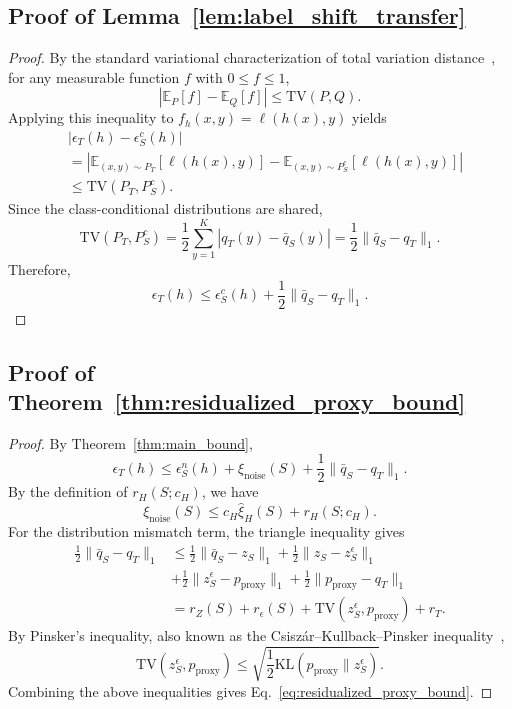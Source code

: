 \documentclass[conference]{IEEEtran}
\theoremstyle{definition}
\theoremstyle{remark}
\begin{document}
\subsection{Proof of Lemma~\ref{lem:label_shift_transfer}}
\begin{proof}
By the standard variational characterization of total variation distance~\cite{gibbs2002choosing}, for any measurable function $f$ with $0\le f\le 1$,
\[
\left|
\mathbb E_P[f]-\mathbb E_Q[f]
\right|
\le
\mathrm{TV}(P,Q).
\]
Applying this inequality to $f_h(x,y)=\ell(h(x),y)$ yields
\begin{align}
&\big|\epsilon_T(h)-\epsilon_S^c(h)\big| \\
&=
\left|
\mathbb{E}_{(x,y)\sim P_T}
\left[
\ell(h(x),y)
\right]
-
\mathbb{E}_{(x,y)\sim P_S^c}
\left[
\ell(h(x),y)
\right]
\right| \\
&\le
\mathrm{TV}(P_T,P_S^c).
\end{align}
Since the class-conditional distributions are shared,
\begin{equation}
\label{eq:TV_equality}
\mathrm{TV}(P_T,P_S^c)
=
\frac{1}{2}
\sum_{y=1}^{K}
\left|
q_T(y)-\bar q_S(y)
\right|
=
\frac{1}{2}
\|\bar q_S-q_T\|_1.
\end{equation}
Therefore,
\[
\epsilon_T(h)
\le
\epsilon_S^c(h)
+
\frac{1}{2}\|\bar q_S-q_T\|_1.
\]
\end{proof}
\subsection{Proof of Theorem~\ref{thm:residualized_proxy_bound}}
\begin{proof}
By Theorem~\ref{thm:main_bound},
\begin{equation}
\epsilon_T(h)
\le
\epsilon_S^n(h)
+
\xi_{\mathrm{noise}}(S)
+
\frac12\|\bar q_S-q_T\|_1.
\end{equation}
By the definition of $r_H(S;c_H)$, we have
\begin{equation}
\xi_{\mathrm{noise}}(S)
\le
c_H\widehat{\xi}_{H}(S)
+
r_H(S;c_H).
\end{equation}
For the distribution mismatch term, the triangle inequality gives
\begin{align}
\frac12\|\bar q_S-q_T\|_1
&\le
\frac12\|\bar q_S-z_S\|_1
+
\frac12\|z_S-z_S^\epsilon\|_1
\\&+
\frac12\|z_S^\epsilon-p_{\mathrm{proxy}}\|_1
+
\frac12\|p_{\mathrm{proxy}}-q_T\|_1\\
&=
r_Z(S)
+
r_\epsilon(S)
+
\mathrm{TV}(z_S^\epsilon,p_{\mathrm{proxy}})
+
r_T.
\end{align}
By Pinsker's inequality, also known as the Csisz{\'a}r--Kullback--Pinsker inequality~\cite{pinsker1964information,csiszar1967information},
\begin{equation}
\mathrm{TV}(z_S^\epsilon,p_{\mathrm{proxy}})
\le
\sqrt{
\frac12
\mathrm{KL}
\left(
p_{\mathrm{proxy}}\|z_S^\epsilon
\right)
}.
\end{equation}
Combining the above inequalities gives Eq.~\eqref{eq:residualized_proxy_bound}.
\end{proof}
\end{document}

